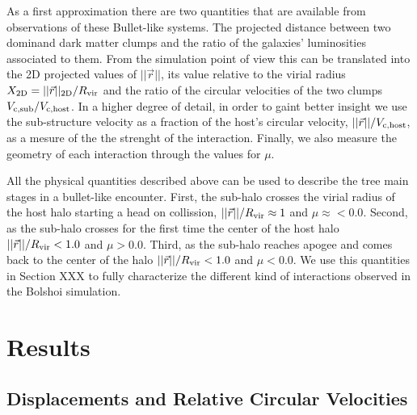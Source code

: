\documentclass{emulateapj}
\begin{document}
As a first approximation there are two quantities that are available
from observations of these Bullet-like systems. The projected distance
between two dominand dark matter clumps and the ratio of the
galaxies' luminosities associated to them. From the simulation point
of view this can be translated into the 2D projected values of
$||\vec{r}||$, its value relative to the virial radius $X_{\rm 2D}=
||\vec{r}||_{\rm 2D}/R_{\rm vir}$ and the ratio of the circular velocities
of the two clumps $V_{\rm c,sub}/V_{\rm c,host}$. In a higher degree
of detail, in order to gaint better insight we use
the sub-structure velocity as a fraction of the host's circular
velocity, $||\vec{r}||/V_{\rm c, host}$, as a mesure of the the strenght
of the interaction.  Finally, we also measure the geometry of each
interaction through the values for $\mu$.


All the physical quantities described above can be used to describe
the tree main stages in a bullet-like encounter. First, the sub-halo
crosses the virial radius of the host halo starting a head on
collission, $||\vec{r}||/R_{\rm vir}\approx 1$ and
$\mu\approx<0.0$. Second, as the sub-halo crosses for the first time
the center of the host halo $||\vec{r}||/R_{\rm vir} < 1.0$ and
$\mu>0.0$. Third, as the sub-halo reaches apogee and comes back to the
center of the halo $||\vec{r}||/R_{\rm vir} < 1.0$ and $\mu<0.0$. We use
this quantities in Section XXX to fully characterize the different
kind of interactions observed in the Bolshoi simulation. 



\section{Results}
\label{sec:results}

\subsection{Displacements and Relative Circular Velocities}
\label{fig:displacement}
\end{document}
